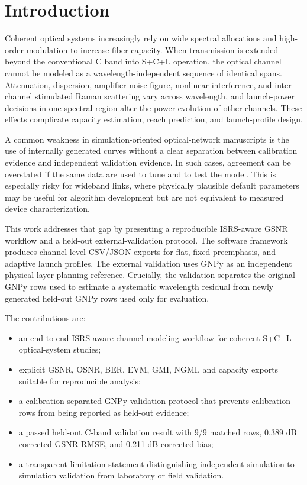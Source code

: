 \documentclass[conference]{IEEEtran}
\begin{document}
\section{Introduction}
Coherent optical systems increasingly rely on wide spectral allocations and high-order modulation to increase fiber capacity. When transmission is extended beyond the conventional C band into S+C+L operation, the optical channel cannot be modeled as a wavelength-independent sequence of identical spans. Attenuation, dispersion, amplifier noise figure, nonlinear interference, and inter-channel stimulated Raman scattering vary across wavelength, and launch-power decisions in one spectral region alter the power evolution of other channels. These effects complicate capacity estimation, reach prediction, and launch-profile design.

A common weakness in simulation-oriented optical-network manuscripts is the use of internally generated curves without a clear separation between calibration evidence and independent validation evidence. In such cases, agreement can be overstated if the same data are used to tune and to test the model. This is especially risky for wideband links, where physically plausible default parameters may be useful for algorithm development but are not equivalent to measured device characterization.

This work addresses that gap by presenting a reproducible ISRS-aware GSNR workflow and a held-out external-validation protocol. The software framework produces channel-level CSV/JSON exports for flat, fixed-preemphasis, and adaptive launch profiles. The external validation uses GNPy as an independent physical-layer planning reference. Crucially, the validation separates the original GNPy rows used to estimate a systematic wavelength residual from newly generated held-out GNPy rows used only for evaluation.

The contributions are:
\begin{itemize}
    \item an end-to-end ISRS-aware channel modeling workflow for coherent S+C+L optical-system studies;
    \item explicit GSNR, OSNR, BER, EVM, GMI, NGMI, and capacity exports suitable for reproducible analysis;
    \item a calibration-separated GNPy validation protocol that prevents calibration rows from being reported as held-out evidence;
    \item a passed held-out C-band validation result with 9/9 matched rows, 0.389 dB corrected GSNR RMSE, and 0.211 dB corrected bias;
    \item a transparent limitation statement distinguishing independent simulation-to-simulation validation from laboratory or field validation.
\end{itemize}
\end{document}
